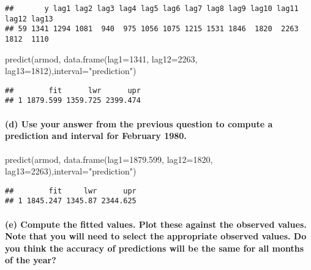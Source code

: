 \documentclass[
]{article}
\newenvironment{Shaded}{\begin{snugshade}}{\end{snugshade}}
\newcommand{\AttributeTok}[1]{\textcolor[rgb]{0.77,0.63,0.00}{#1}}
\newcommand{\DecValTok}[1]{\textcolor[rgb]{0.00,0.00,0.81}{#1}}
\newcommand{\FloatTok}[1]{\textcolor[rgb]{0.00,0.00,0.81}{#1}}
\newcommand{\FunctionTok}[1]{\textcolor[rgb]{0.00,0.00,0.00}{#1}}
\newcommand{\NormalTok}[1]{#1}
\newcommand{\StringTok}[1]{\textcolor[rgb]{0.31,0.60,0.02}{#1}}
\begin{document}
\begin{verbatim}
##       y lag1 lag2 lag3 lag4 lag5 lag6 lag7 lag8 lag9 lag10 lag11 lag12 lag13
## 59 1341 1294 1081  940  975 1056 1075 1215 1531 1846  1820  2263  1812  1110
\end{verbatim}

\begin{Shaded}
\begin{Highlighting}[]
\FunctionTok{predict}\NormalTok{(armod, }\FunctionTok{data.frame}\NormalTok{(}\AttributeTok{lag1=}\DecValTok{1341}\NormalTok{, }\AttributeTok{lag12=}\DecValTok{2263}\NormalTok{, }\AttributeTok{lag13=}\DecValTok{1812}\NormalTok{),}\AttributeTok{interval=}\StringTok{"prediction"}\NormalTok{)}
\end{Highlighting}
\end{Shaded}

\begin{verbatim}
##        fit      lwr      upr
## 1 1879.599 1359.725 2399.474
\end{verbatim}

\hypertarget{d-use-your-answer-from-the-previous-question-to-compute-a-prediction-and-interval-for-february-1980.}{%
\paragraph{(d) Use your answer from the previous question to compute a
prediction and interval for February
1980.}\label{d-use-your-answer-from-the-previous-question-to-compute-a-prediction-and-interval-for-february-1980.}}

\begin{Shaded}
\begin{Highlighting}[]
\FunctionTok{predict}\NormalTok{(armod, }\FunctionTok{data.frame}\NormalTok{(}\AttributeTok{lag1=}\FloatTok{1879.599}\NormalTok{, }\AttributeTok{lag12=}\DecValTok{1820}\NormalTok{, }\AttributeTok{lag13=}\DecValTok{2263}\NormalTok{),}\AttributeTok{interval=}\StringTok{"prediction"}\NormalTok{)}
\end{Highlighting}
\end{Shaded}

\begin{verbatim}
##        fit     lwr      upr
## 1 1845.247 1345.87 2344.625
\end{verbatim}

\hypertarget{e-compute-the-fitted-values.-plot-these-against-the-observed-values.-note-that-you-will-need-to-select-the-appropriate-observed-values.-do-you-think-the-accuracy-of-predictions-will-be-the-same-for-all-months-of-the-year}{%
\paragraph{(e) Compute the fitted values. Plot these against the
observed values. Note that you will need to select the appropriate
observed values. Do you think the accuracy of predictions will be the
same for all months of the
year?}\label{e-compute-the-fitted-values.-plot-these-against-the-observed-values.-note-that-you-will-need-to-select-the-appropriate-observed-values.-do-you-think-the-accuracy-of-predictions-will-be-the-same-for-all-months-of-the-year}}
\end{document}
